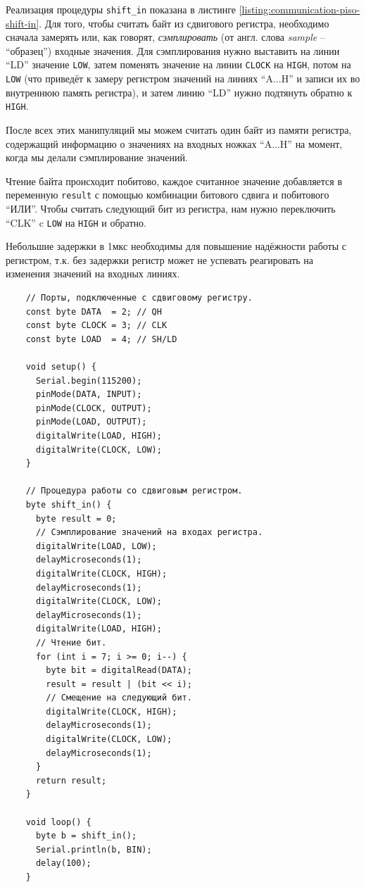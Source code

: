 \documentclass[../sparc.tex]{subfiles}
\begin{document}
Реализация процедуры \texttt{shift_in} показана в листинге
\ref{listing:communication-piso-shift-in}.  Для того, чтобы считать байт из
сдвигового регистра, необходимо сначала замерять или, как говорят,
\emph{сэмплировать} (от англ. слова \emph{sample} -- ``образец'') входные
значения.  Для сэмплирования нужно выставить на линии ``LD'' значение
\texttt{LOW}, затем поменять значение на линии \texttt{CLOCK} на \texttt{HIGH},
потом на \texttt{LOW} (что приведёт к замеру регистром значений на линиях
``A...H'' и записи их во внутреннюю память регистра), и затем линию ``LD'' нужно
подтянуть обратно к \texttt{HIGH}.

После всех этих манипуляций мы можем считать один байт из памяти регистра,
содержащий информацию о значениях на входных ножках ``A...H'' на момент, когда
мы делали сэмплирование значений.

Чтение байта происходит побитово, каждое считанное значение добавляется в
переменную \texttt{result} с помощью комбинации битового сдвига и
побитового ``ИЛИ''.  Чтобы считать следующий бит из регистра, нам нужно
переключить ``CLK'' c \texttt{LOW} на \texttt{HIGH} и обратно.

Небольшие задержки в 1мкс необходимы для повышение надёжности работы с
регистром, т.к. без задержки регистр может не успевать реагировать на изменения
значений на входных линиях.

\begin{listing}[H]
  \begin{verbatim}
    // Порты, подключенные с сдвиговому регистру.
    const byte DATA  = 2; // QH
    const byte CLOCK = 3; // CLK
    const byte LOAD  = 4; // SH/LD

    void setup() {
      Serial.begin(115200);
      pinMode(DATA, INPUT);
      pinMode(CLOCK, OUTPUT);
      pinMode(LOAD, OUTPUT);
      digitalWrite(LOAD, HIGH);
      digitalWrite(CLOCK, LOW);
    }

    // Процедура работы со сдвиговым регистром.
    byte shift_in() {
      byte result = 0;
      // Сэмплирование значений на входах регистра.
      digitalWrite(LOAD, LOW);
      delayMicroseconds(1);
      digitalWrite(CLOCK, HIGH);
      delayMicroseconds(1);
      digitalWrite(CLOCK, LOW);
      delayMicroseconds(1);
      digitalWrite(LOAD, HIGH);
      // Чтение бит.
      for (int i = 7; i >= 0; i--) {
        byte bit = digitalRead(DATA);
        result = result | (bit << i);
        // Смещение на следующий бит.
        digitalWrite(CLOCK, HIGH);
        delayMicroseconds(1);
        digitalWrite(CLOCK, LOW);
        delayMicroseconds(1);
      }
      return result;
    }

    void loop() {
      byte b = shift_in();
      Serial.println(b, BIN);
      delay(100);
    }
  \end{verbatim}
  \label{listing:communication-piso-shift-in}
  \caption{Процедура последовательного чтения одного байта из сдвигового
    регистра.}
\end{listing}
\end{document}
